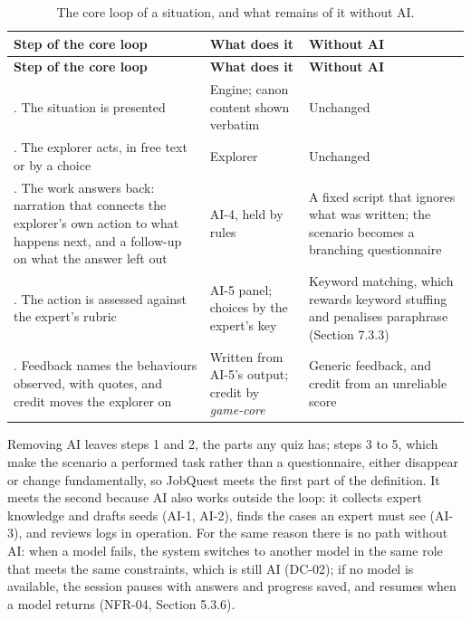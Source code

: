 {\small
\begin{longtable}{|>{\raggedright\arraybackslash}p{}|>{\raggedright\arraybackslash}p{}|>{\raggedright\arraybackslash}p{}|}
\caption{The core loop of a situation, and what remains of it without AI.} \\
\hline
\textbf{Step of the core loop} & \textbf{What does it} & \textbf{Without AI} \\ \hline
\endfirsthead
\hline
\textbf{Step of the core loop} & \textbf{What does it} & \textbf{Without AI} \\ \hline
\endhead
1. The situation is presented & Engine; canon content shown verbatim & Unchanged \\ \hline
2. The explorer acts, in free text or by a choice & Explorer & Unchanged \\ \hline
3. The work answers back: narration that connects the explorer's own action to what happens next, and a follow-up on what the answer left out & AI-4, held by rules & A fixed script that ignores what was written; the scenario becomes a branching questionnaire \\ \hline
4. The action is assessed against the expert's rubric & AI-5 panel; choices by the expert's key & Keyword matching, which rewards keyword stuffing and penalises paraphrase (Section 7.3.3) \\ \hline
5. Feedback names the behaviours observed, with quotes, and credit moves the explorer on & Written from AI-5's output; credit by \textit{game-core} & Generic feedback, and credit from an unreliable score \\ \hline
\end{longtable}
}

Removing AI leaves steps 1 and 2, the parts any quiz has; steps 3 to 5, which make the scenario a performed task rather than a questionnaire, either disappear or change fundamentally, so JobQuest meets the first part of the definition. It meets the second because AI also works outside the loop: it collects expert knowledge and drafts seeds (AI-1, AI-2), finds the cases an expert must see (AI-3), and reviews logs in operation. For the same reason there is no path without AI: when a model fails, the system switches to another model in the same role that meets the same constraints, which is still AI (DC-02); if no model is available, the session pauses with answers and progress saved, and resumes when a model returns (NFR-04, Section 5.3.6).

